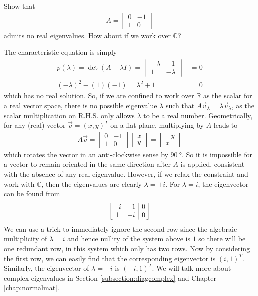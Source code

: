 \begin{exmp}
\label{exmp:norealeig}
Show that 
\begin{align*}
A = \begin{bmatrix}
0 & -1 \\
1 & 0 
\end{bmatrix}
\end{align*}
admits no real eigenvalues. How about if we work over $\mathbb{C}$?
\end{exmp}
\begin{solution}
The characteristic equation is simply
\begin{align*}
p(\lambda) = \det(A-\lambda I) = \begin{vmatrix}
-\lambda & -1 \\
1 & -\lambda
\end{vmatrix} &= 0 \\
(-\lambda)^2 - (1)(-1) = \lambda^2 + 1 &= 0
\end{align*}
which has no real solution. So, if we are confined to work over $\mathbb{R}$ as the scalar for a real vector space, there is no possible eigenvalue $\lambda$ such that $A\vec{v}_\lambda = \lambda\vec{v}_\lambda$, as the scalar multiplication on R.H.S. only allows $\lambda$ to be a real number. Geometrically, for any (real) vector $\vec{v} = (x,y)^T$ on a flat plane, multiplying by $A$ leads to
\begin{align*}
A\vec{v} = 
\begin{bmatrix}
0 & -1 \\
1 & 0 
\end{bmatrix}
\begin{bmatrix}
x \\
y
\end{bmatrix}
=
\begin{bmatrix}
-y \\
x
\end{bmatrix}
\end{align*}
which rotates the vector in an anti-clockwise sense by $\SI{90}{\degree}$. So it is impossible for a vector to remain oriented in the same direction after $A$ is applied, consistent with the absence of any real eigenvalue. However, if we relax the constraint and work with $\mathbb{C}$, then the eigenvalues are clearly $\lambda = \pm i$. For $\lambda = i$, the eigenvector can be found from
\begin{align*}
\left[\begin{array}{@{\,}wc{10pt}wc{10pt}|c@{\,}}
-i & -1 & 0\\
1 &-i & 0
\end{array}\right]
\end{align*}
We can use a trick to immediately ignore the second row since the algebraic multiplicity of $\lambda = i$ and hence nullity of the system above is $1$ so there will be one redundant row, in this system which only has two rows. Now by considering the first row, we can easily find that the corresponding eigenvector is $(i,1)^T$. Similarly, the eigenvector of $\lambda = -i$ is $(-i,1)^T$. We will talk more about complex eigenvalues in Section \ref{subsection:diagcomplex} and Chapter \ref{chap:normalmat}.
\end{solution}

